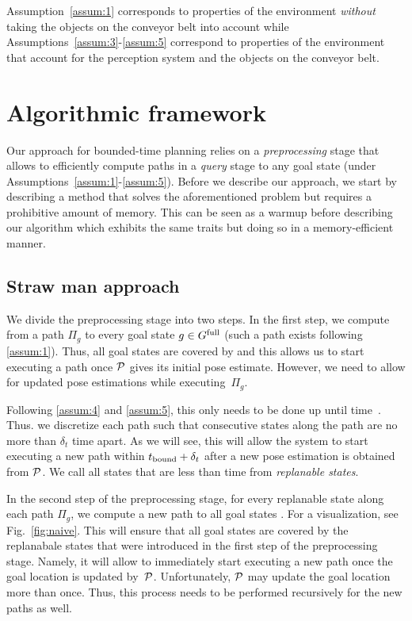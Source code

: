 \documentclass[conference]{IEEEtran}
\begin{document}
Assumption~\ref{assum:1} corresponds to properties of the environment \emph{without} taking the objects on the conveyor belt into account 
while
Assumptions~\ref{assum:3}-\ref{assum:5} correspond to properties of the environment that account for the perception system and the objects on the conveyor belt.


\section{Algorithmic framework}
\label{subsec:strawman}
Our approach for bounded-time planning relies on a \emph{preprocessing} stage that allows to efficiently compute paths in a \emph{query} stage to any goal state (under Assumptions~\ref{assum:1}-\ref{assum:5}). 
%
Before we describe our approach, we start by describing a \naive method that solves the aforementioned problem but requires a prohibitive amount of memory.
%
This can be seen as a warmup before describing our algorithm which exhibits the same traits but doing so in a memory-efficient manner.

\subsection{Straw man approach}
We divide the preprocessing stage into two steps.
In the first step, we compute from \Shome a path $\Pi_g$ to every goal state $ g \in G^{\textrm{full}}$ (such a path exists following \ref{assum:1}).
Thus, all goal states are covered by \Shome and this allows us to start executing a path once $\mathcal{P}$ gives its initial pose estimate.
However, we need to allow for updated pose estimations while executing~$\Pi_g$. 

%
Following \ref{assum:4} and \ref{assum:5}, this only needs to be done up until time~\Trc.
Thus. we discretize each path such that consecutive states along the path are no more than $\delta _t$ time apart. As we will see, this will allow the system to start executing a new path within $t_{\textrm{bound}} + \delta_t$ after a new pose estimation is obtained from $\mathcal{P}$.
%
We call all states that are less than \Trc time from \Shome \emph{replanable states}.


In the second step of the preprocessing stage, for every replanable state along each path $\Pi_g$, we compute a new path to all goal states .
For a visualization, see Fig.~\ref{fig:naive}.
%
This will ensure that all goal states are covered by the replanabale states that were introduced in the first step of the preprocessing stage. Namely, it will allow to immediately start executing a new path once the goal location is updated by~$\mathcal{P}$.
%
Unfortunately, $\mathcal{P}$ may update the goal location more than once. Thus, this process needs to be performed recursively for the new paths as well.
\end{document}
